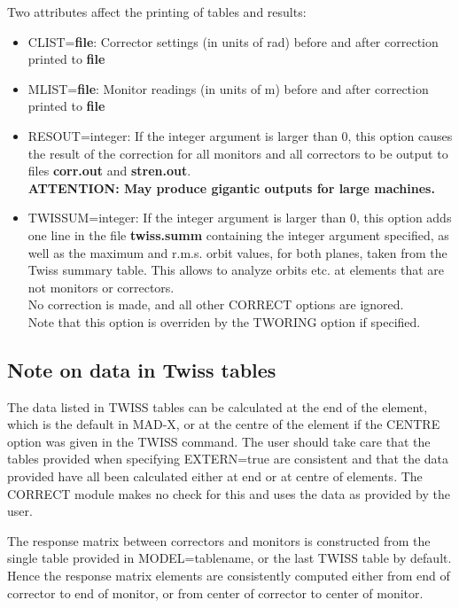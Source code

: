 Two attributes affect the printing of tables and results: 
\begin{itemize}
   \item CLIST=\textbf{file}: Corrector settings (in units of rad)
     before and after correction printed to \textbf{file} 

   \item MLIST=\textbf{file}: Monitor readings (in units of m) before
     and after correction printed to \textbf{file} 

   \item RESOUT=integer: If the integer argument is larger than 0, this
     option causes the result of the correction for all monitors and all
     correctors to be output to files {\bf corr.out} and
     {\bf stren.out}. 
     \\\textbf{ATTENTION: May produce gigantic outputs for large
       machines.} 
     \\

   \item TWISSUM=integer:  
     If the integer argument is larger than 0, this option
     adds one line in the file {\bf twiss.summ} containing the integer
     argument specified, as well as the maximum and r.m.s. orbit values,
     for both planes, taken from the Twiss summary table.  
     This allows to analyze orbits etc. at elements that are not
     monitors or correctors.\\ 
     No correction is made, and all other CORRECT options are ignored. \\
     Note that this option is overriden by the TWORING option if specified. 
\end{itemize}

\subsection{Note on data in Twiss tables}

The data listed in TWISS tables can be calculated at the end of the
element, which is the default in MAD-X, or at the centre of the element
if the CENTRE option was given in the TWISS command. 
The user should take care that the tables provided when specifying
EXTERN=true are consistent and that the data provided have all been
calculated either at end or at centre of elements.  
The CORRECT module makes no check for this and uses the data as provided
by the user.  

The response matrix between correctors and monitors is constructed from
the single table provided in MODEL=tablename, or the last TWISS table by
default. Hence the response matrix elements are consistently computed
either from end of corrector to end of monitor, or from center of
corrector to center of monitor. 


